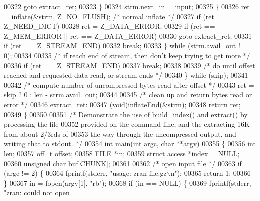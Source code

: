 \begin{DoxyCode}
00322                     \textcolor{keywordflow}{goto} extract\_ret;
00323                 \}
00324                 strm.next\_in = input;
00325             \}
00326             ret = inflate(&strm, Z\_NO\_FLUSH);       \textcolor{comment}{/* normal inflate */}
00327             \textcolor{keywordflow}{if} (ret == Z\_NEED\_DICT)
00328                 ret = Z\_DATA\_ERROR;
00329             \textcolor{keywordflow}{if} (ret == Z\_MEM\_ERROR || ret == Z\_DATA\_ERROR)
00330                 \textcolor{keywordflow}{goto} extract\_ret;
00331             \textcolor{keywordflow}{if} (ret == Z\_STREAM\_END)
00332                 \textcolor{keywordflow}{break};
00333         \} \textcolor{keywordflow}{while} (strm.avail\_out != 0);
00334 
00335         \textcolor{comment}{/* if reach end of stream, then don't keep trying to get more */}
00336         \textcolor{keywordflow}{if} (ret == Z\_STREAM\_END)
00337             \textcolor{keywordflow}{break};
00338 
00339         \textcolor{comment}{/* do until offset reached and requested data read, or stream ends */}
00340     \} \textcolor{keywordflow}{while} (skip);
00341 
00342     \textcolor{comment}{/* compute number of uncompressed bytes read after offset */}
00343     ret = skip ? 0 : len - strm.avail\_out;
00344 
00345     \textcolor{comment}{/* clean up and return bytes read or error */}
00346   extract\_ret:
00347     (void)inflateEnd(&strm);
00348     \textcolor{keywordflow}{return} ret;
00349 \}
00350 
00351 \textcolor{comment}{/* Demonstrate the use of build\_index() and extract() by processing the file}
00352 \textcolor{comment}{   provided on the command line, and the extracting 16K from about 2/3rds of}
00353 \textcolor{comment}{   the way through the uncompressed output, and writing that to stdout. */}
00354 \textcolor{keywordtype}{int} main(\textcolor{keywordtype}{int} argc, \textcolor{keywordtype}{char} **argv)
00355 \{
00356     \textcolor{keywordtype}{int} len;
00357     off\_t offset;
00358     FILE *in;
00359     \textcolor{keyword}{struct }\hyperlink{structaccess}{access} *index = NULL;
00360     \textcolor{keywordtype}{unsigned} \textcolor{keywordtype}{char} buf[CHUNK];
00361 
00362     \textcolor{comment}{/* open input file */}
00363     \textcolor{keywordflow}{if} (argc != 2) \{
00364         fprintf(stderr, \textcolor{stringliteral}{"usage: zran file.gz\(\backslash\)n"});
00365         \textcolor{keywordflow}{return} 1;
00366     \}
00367     in = fopen(argv[1], \textcolor{stringliteral}{"rb"});
00368     \textcolor{keywordflow}{if} (in == NULL) \{
00369         fprintf(stderr, \textcolor{stringliteral}{"zran: could not open %
}
\end{DoxyCode}
